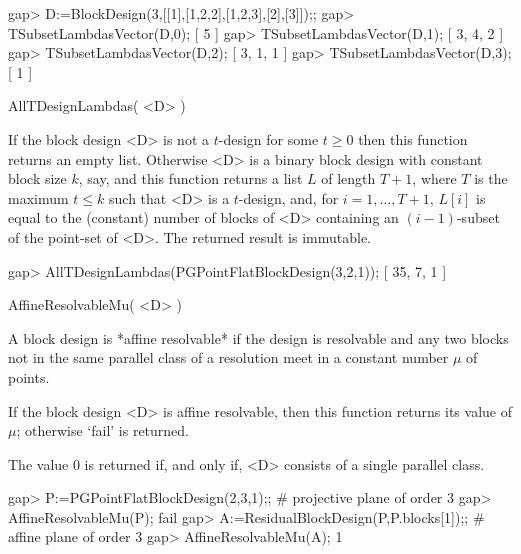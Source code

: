 \beginexample
gap> D:=BlockDesign(3,[[1],[1,2,2],[1,2,3],[2],[3]]);;
gap> TSubsetLambdasVector(D,0);
[ 5 ]
gap> TSubsetLambdasVector(D,1);
[ 3, 4, 2 ]
gap> TSubsetLambdasVector(D,2);
[ 3, 1, 1 ]
gap> TSubsetLambdasVector(D,3);
[ 1 ]
\endexample



\>AllTDesignLambdas( <D> )

If the block design <D> is not a $t$-design for some $t\ge 0$ then this
function returns an empty list. Otherwise <D> is a binary block design
with constant block size $k$, say, and this function returns a list
$L$ of length $T+1$, where $T$ is the maximum $t\le k$ such that <D>
is a $t$-design, and, for $i=1,\ldots,T+1$, $L[i]$ is equal to the
(constant) number of blocks of <D> containing an $(i-1)$-subset of
the point-set of <D>. The returned result is immutable.

\beginexample
gap> AllTDesignLambdas(PGPointFlatBlockDesign(3,2,1));                  
[ 35, 7, 1 ]
\endexample



\>AffineResolvableMu( <D> )

A block design is *affine resolvable* if the design is resolvable 
and any two blocks not in the same parallel class of a resolution 
meet in a constant number $\mu$ of points. 

If the block design <D> is affine resolvable, then this function
returns its value of $\mu$; otherwise `fail' is returned.
 
The value 0 is returned if, and only if, <D> consists of a single
parallel class.

\beginexample
gap> P:=PGPointFlatBlockDesign(2,3,1);; # projective plane of order 3 
gap> AffineResolvableMu(P);
fail
gap> A:=ResidualBlockDesign(P,P.blocks[1]);; # affine plane of order 3
gap> AffineResolvableMu(A);                                           
1
\endexample
